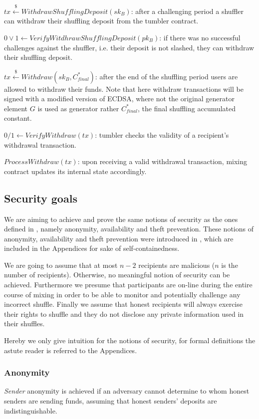 \documentclass[a4paper,UKenglish,cleveref, autoref]{oasics-v2019}
\begin{document}
$tx\stackrel{\$}{\leftarrow}WithdrawShufflingDeposit(sk_B)$: after a challenging period a shuffler can withdraw their shuffling deposit from the tumbler contract.

$0\lor1\leftarrow VerifyWitdhrawShufflingDeposit(pk_B)$: if there was no successful challenges against the shuffler, i.e. their deposit is not slashed, they can withdraw their shuffling deposit. 

$tx\stackrel{\$}{\leftarrow}Withdraw(sk_B, C^{*}_{final})$: after the end of the shuffling period users are allowed to withdraw their funds. Note that here withdraw transactions will be signed with a modified version of ECDSA, where not the original generator element $G$ is used as generator rather $C^{*}_{final}$, the final shuffling accumulated constant.

$0/1\leftarrow VerifyWithdraw(tx)$: tumbler checks the validity of a recipient's withdrawal transaction.

$ProcessWithdraw(tx)$: upon receiving a valid withdrawal transaction, mixing contract updates its internal state accordingly.

\subsection{Security goals} \label{securitygoals}
We are aiming to achieve and prove the same notions of security as the ones defined in \cite{meiklejohn2018mobius}, namely anonymity, availability and theft prevention. These notions of anonymity, availability and theft prevention were introduced in \cite{meiklejohn2018mobius}, which are included in the Appendices for sake of self-containedness.

We are going to assume that at most $n-2$ recipients are malicious ($n$ is the number of recipients). Otherwise, no meaningful notion of security can be achieved. Furthermore we presume that participants are on-line during the entire course of mixing in order to be able to monitor and potentially challenge any incorrect shuffle. Finally we assume that honest recipients will always exercise their rights to shuffle and they do not disclose any private information used in their shuffles.

Hereby we only give intuition for the notions of security, for formal definitions the astute reader is referred to the Appendices.

\subsubsection{Anonymity} \label{sec:defanonymity}
\textit{Sender} anonymity is achieved if an adversary cannot determine to whom honest senders are sending funds, assuming that honest senders' deposits are indistinguishable.
\end{document}
